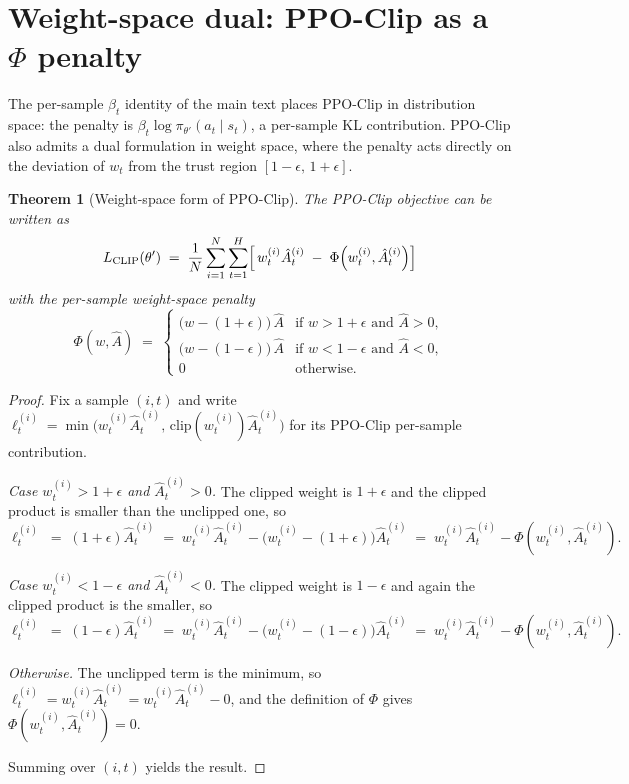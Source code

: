 \documentclass{article}
\newtheorem{theorem}{Theorem}
\begin{document}
\small


\normalsize

\clearpage



\appendix
\raggedbottom
\makeatletter
\setlength{\@fptop}{0pt}
\makeatother

\section{Weight-space dual: PPO-Clip as a $\Phi$ penalty}
\label{app:phi}

The per-sample $\beta_t$ identity of the main text places PPO-Clip in
distribution space: the penalty is $\beta_t \log \pi_{\theta'}(a_t \mid
s_t)$, a per-sample KL contribution. PPO-Clip also admits a dual
formulation in weight space, where the penalty acts directly on the
deviation of $w_t$ from the trust region $[1-\epsilon,\, 1+\epsilon]$.

\begin{theorem}[Weight-space form of PPO-Clip]
\label{thm:phi}
The PPO-Clip objective can be written as
\[
L_{\mathrm{CLIP}}(\theta')
\;=\;
\frac{1}{N}\sum_{i=1}^{N}\sum_{t=1}^{H}
  \Bigl[\,w_t^{(i)}\hat{A}_t^{(i)} \;-\; \Phi\!\left(w_t^{(i)}, \hat{A}_t^{(i)}\right)\Bigr]
\]
with the per-sample weight-space penalty
\[
\Phi(w, \hat{A})
\;=\;
\begin{cases}
\bigl(w - (1+\epsilon)\bigr)\,\hat{A} & \text{if } w > 1+\epsilon \text{ and } \hat{A} > 0, \\[3pt]
\bigl(w - (1-\epsilon)\bigr)\,\hat{A} & \text{if } w < 1-\epsilon \text{ and } \hat{A} < 0, \\[3pt]
0 & \text{otherwise.}
\end{cases}
\]
\end{theorem}

\begin{proof}
Fix a sample $(i, t)$ and write $\ell_t^{(i)} =
\min\!\bigl(w_t^{(i)}\hat{A}_t^{(i)},\, \mathrm{clip}(w_t^{(i)})
\hat{A}_t^{(i)}\bigr)$ for its PPO-Clip per-sample contribution.

\emph{Case $w_t^{(i)} > 1+\epsilon$ and $\hat{A}_t^{(i)} > 0$.} The
clipped weight is $1+\epsilon$ and the clipped product is smaller than
the unclipped one, so
\[
\ell_t^{(i)} \;=\; (1+\epsilon)\hat{A}_t^{(i)}
\;=\; w_t^{(i)}\hat{A}_t^{(i)} - \bigl(w_t^{(i)} - (1+\epsilon)\bigr)\hat{A}_t^{(i)}
\;=\; w_t^{(i)}\hat{A}_t^{(i)} - \Phi(w_t^{(i)}, \hat{A}_t^{(i)}).
\]

\emph{Case $w_t^{(i)} < 1-\epsilon$ and $\hat{A}_t^{(i)} < 0$.} The
clipped weight is $1-\epsilon$ and again the clipped product is the
smaller, so
\[
\ell_t^{(i)} \;=\; (1-\epsilon)\hat{A}_t^{(i)}
\;=\; w_t^{(i)}\hat{A}_t^{(i)} - \bigl(w_t^{(i)} - (1-\epsilon)\bigr)\hat{A}_t^{(i)}
\;=\; w_t^{(i)}\hat{A}_t^{(i)} - \Phi(w_t^{(i)}, \hat{A}_t^{(i)}).
\]

\emph{Otherwise.} The unclipped term is the minimum, so $\ell_t^{(i)}
= w_t^{(i)}\hat{A}_t^{(i)} = w_t^{(i)}\hat{A}_t^{(i)} - 0$, and the
definition of $\Phi$ gives $\Phi(w_t^{(i)}, \hat{A}_t^{(i)}) = 0$.

Summing over $(i, t)$ yields the result.
\end{proof}
\end{document}
